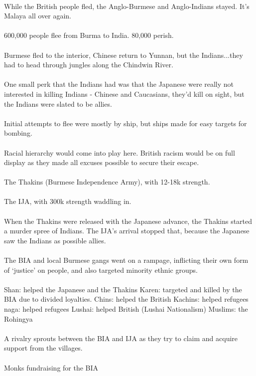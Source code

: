 \documentclass[a4paper]{article}
\begin{document}
\\
While the British people fled, the Anglo-Burmese and Anglo-Indians stayed. It's Malaya all over again.\\
\\
600,000 people flee from Burma to India. 80,000 perish.\\
\\
Burmese fled to the interior, Chinese return to Yunnan, but the Indians...they had to head through jungles along the Chindwin River.\\
\\
One small perk that the Indians had was that the Japanese were really not interested in killing Indians - Chinese and Caucasians, they'd kill on sight, but the Indians were slated to be allies.\\
\\
Initial attempts to flee were mostly by ship, but ships made for easy targets for bombing.\\
\\
Racial hierarchy would come into play here. British racism would be on full display as they made all excuses possible to secure their escape.\\
\\
The Thakins (Burmese Independence Army), with 12-18k strength.\\
\\
The IJA, with 300k strength waddling in.\\
\\
When the Thakins were released with the Japanese advance, the Thakins started a murder spree of Indians. The IJA's arrival stopped that, because the Japanese saw the Indians as possible allies.\\
\\
The BIA and local Burmese gangs went on a rampage, inflicting their own form of `justice' on people, and also targeted minority ethnic groups.\\
\\
Shan: helped the Japanese and the Thakins
Karen: targeted and killed by the BIA due to divided loyalties.
Chins: helped the British
Kachins: helped refugees
naga: helped refugees
Lushai: helped British (Lushai Nationalism)
Muslims: the Rohingya\\
\\
A rivalry sprouts between the BIA and IJA as they try to claim and acquire support from the villages.\\
\\
Monks fundraising for the BIA\\
\end{document}
